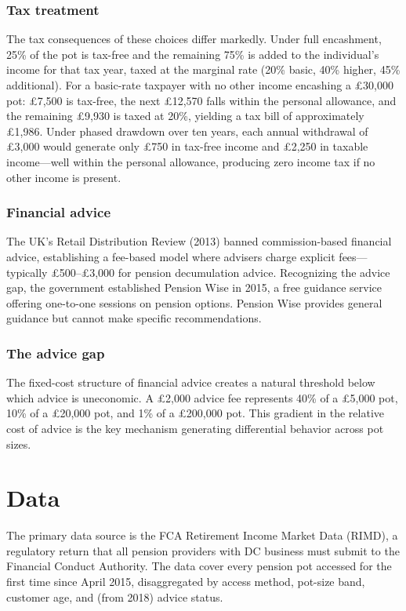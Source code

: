 \documentclass[12pt]{article}
\begin{document}
\subsubsection*{Tax treatment} The tax consequences of these choices differ markedly. Under full encashment, 25\% of the pot is tax-free and the remaining 75\% is added to the individual's income for that tax year, taxed at the marginal rate (20\% basic, 40\% higher, 45\% additional). For a basic-rate taxpayer with no other income encashing a \pounds30,000 pot: \pounds7,500 is tax-free, the next \pounds12,570 falls within the personal allowance, and the remaining \pounds9,930 is taxed at 20\%, yielding a tax bill of approximately \pounds1,986. Under phased drawdown over ten years, each annual withdrawal of \pounds3,000 would generate only \pounds750 in tax-free income and \pounds2,250 in taxable income---well within the personal allowance, producing zero income tax if no other income is present.

\subsubsection*{Financial advice} The UK's Retail Distribution Review (2013) banned commission-based financial advice, establishing a fee-based model where advisers charge explicit fees---typically \pounds500--\pounds3,000 for pension decumulation advice. Recognizing the advice gap, the government established Pension Wise in 2015, a free guidance service offering one-to-one sessions on pension options. Pension Wise provides general guidance but cannot make specific recommendations.

\subsubsection*{The advice gap} The fixed-cost structure of financial advice creates a natural threshold below which advice is uneconomic. A \pounds2,000 advice fee represents 40\% of a \pounds5,000 pot, 10\% of a \pounds20,000 pot, and 1\% of a \pounds200,000 pot. This gradient in the relative cost of advice is the key mechanism generating differential behavior across pot sizes.

\section{Data}

The primary data source is the FCA Retirement Income Market Data (RIMD), a regulatory return that all pension providers with DC business must submit to the Financial Conduct Authority. The data cover every pension pot accessed for the first time since April 2015, disaggregated by access method, pot-size band, customer age, and (from 2018) advice status.
\end{document}
